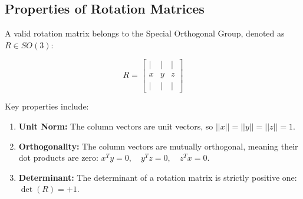 \documentclass[../../master-handout.tex]{subfiles}
\begin{document}
\subsection{Properties of Rotation Matrices}
A valid rotation matrix belongs to the Special Orthogonal Group, denoted as $R \in SO(3)$:
\begin{fullwidth}
\[
R = \begin{bmatrix} | & | & | \\ x & y & z \\ | & | & | \end{bmatrix}
\]
\end{fullwidth}
Key properties include:
\begin{enumerate}
    \item \textbf{Unit Norm:} The column vectors are unit vectors, so $||x|| = ||y|| = ||z|| = 1$.
    \item \textbf{Orthogonality:} The column vectors are mutually orthogonal, meaning their dot products are zero: $x^T y = 0, \quad y^T z = 0, \quad z^T x = 0$.
    \item \textbf{Determinant:} The determinant of a rotation matrix is strictly positive one: $\det(R) = +1$.
\end{enumerate}
\end{document}
